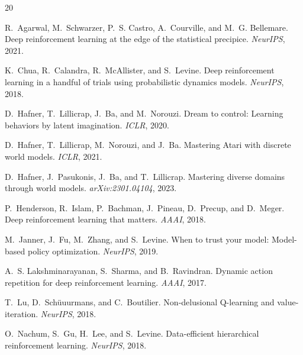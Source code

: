 \documentclass[10pt,letterpaper]{article}
\begin{document}
{\small

\begin{thebibliography}{20}

R.~Agarwal, M.~Schwarzer, P.~S. Castro, A.~Courville, and M.~G. Bellemare.
\newblock Deep reinforcement learning at the edge of the statistical precipice.
\newblock \emph{NeurIPS}, 2021.

K.~Chua, R.~Calandra, R.~McAllister, and S.~Levine.
\newblock Deep reinforcement learning in a handful of trials using probabilistic dynamics models.
\newblock \emph{NeurIPS}, 2018.

D.~Hafner, T.~Lillicrap, J.~Ba, and M.~Norouzi.
\newblock Dream to control: Learning behaviors by latent imagination.
\newblock \emph{ICLR}, 2020.

D.~Hafner, T.~Lillicrap, M.~Norouzi, and J.~Ba.
\newblock Mastering Atari with discrete world models.
\newblock \emph{ICLR}, 2021.

D.~Hafner, J.~Pasukonis, J.~Ba, and T.~Lillicrap.
\newblock Mastering diverse domains through world models.
\newblock \emph{arXiv:2301.04104}, 2023.

P.~Henderson, R.~Islam, P.~Bachman, J.~Pineau, D.~Precup, and D.~Meger.
\newblock Deep reinforcement learning that matters.
\newblock \emph{AAAI}, 2018.

M.~Janner, J.~Fu, M.~Zhang, and S.~Levine.
\newblock When to trust your model: Model-based policy optimization.
\newblock \emph{NeurIPS}, 2019.

A.~S. Lakshminarayanan, S.~Sharma, and B.~Ravindran.
\newblock Dynamic action repetition for deep reinforcement learning.
\newblock \emph{AAAI}, 2017.

T.~Lu, D.~Sch{\"u}uurmans, and C.~Boutilier.
\newblock Non-delusional Q-learning and value-iteration.
\newblock \emph{NeurIPS}, 2018.

O.~Nachum, S.~Gu, H.~Lee, and S.~Levine.
\newblock Data-efficient hierarchical reinforcement learning.
\newblock \emph{NeurIPS}, 2018.


\end{thebibliography}}
\end{document}
